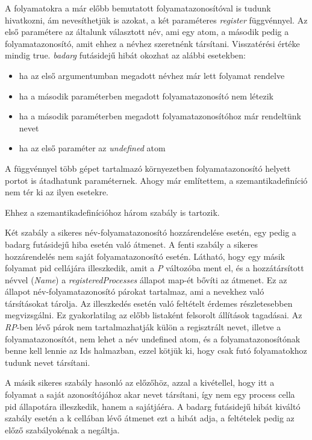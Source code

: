 A folyamatokra a már előbb bemutatott folyamatazonosítóval is tudunk hivatkozni, ám nevesíthetjük is azokat, a két paraméteres \textit{register} függvénnyel. Az első paramétere az általunk választott név, ami egy atom, a második pedig a folyamatazonosító, amit ehhez a névhez szeretnénk társítani. Visszatérési értéke mindig true. \textit{badarg} futásidejű hibát okozhat az alábbi esetekben:

\begin{itemize}
\item ha az első argumentumban megadott névhez már lett folyamat rendelve
\item ha a második paraméterben megadott folyamatazonosító nem létezik
\item ha a második paraméterben megadott folyamatazonosítóhoz már rendeltünk nevet
\item ha az első paraméter az \textit{undefined} atom
\end{itemize}

A függvénnyel több gépet tartalmazó környezetben folyamatazonosító helyett portot is átadhatunk paraméternek. Ahogy már említettem, a szemantikadefiníció nem tér ki az ilyen esetekre.

Ehhez a szemantikadefinícióhoz három szabály is tartozik.



Két szabály a sikeres név-folyamatazonosító hozzárendelése esetén, egy pedig a badarg futásidejű hiba esetén való átmenet. A fenti szabály a sikeres hozzárendelés nem saját folyamatazonosító esetén. Látható, hogy egy másik folyamat pid cellájára illeszkedik, amit a \textit{P} változóba ment el, és a hozzátársított névvel (\textit{Name}) a \textit{registeredProcesses} állapot map-ét bővíti az átmenet. Ez az állapot név-folyamatazonosító párokat tartalmaz, ami a nevekhez való társításokat tárolja. Az illeszkedés esetén való feltételt érdemes részletesebben megvizsgálni. Ez gyakorlatilag az előbb listaként felsorolt állítások tagadásai. Az \textit{RP}-ben lévő párok nem tartalmazhatják külön a regisztrált nevet, illetve a folyamatazonosítót, nem lehet a név undefined atom, és a folyamatazonosítónak benne kell lennie az Ids halmazban, ezzel kötjük ki, hogy csak futó folyamatokhoz tudunk nevet társítani.

A másik sikeres szabály hasonló az előzőhöz, azzal a kivétellel, hogy itt a folyamat a saját azonosítójához akar nevet társítani, így nem egy process cella pid állapotára illeszkedik, hanem a sajátjáéra. A badarg futásidejű hibát kiváltó szabály esetén a k cellában lévő átmenet ezt a hibát adja, a feltételek pedig az előző szabályokénak a negáltja.

